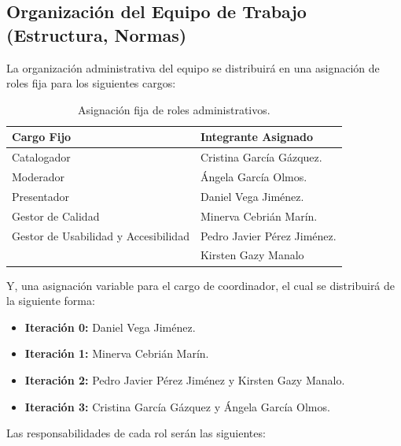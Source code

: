 \subsection{Organización del Equipo de Trabajo (Estructura, Normas)}

La organización administrativa del equipo se distribuirá en una asignación de roles fija para los siguientes cargos:

\begin{table}[htbp]
\centering
\small
{}
\begin{tabularx}{\textwidth}{l X}
\toprule
\rowcolor{verdeApagado}
\textbf{Cargo Fijo} & \textbf{Integrante Asignado} \\
\midrule
Catalogador & Cristina García Gázquez. \\
Moderador & Ángela García Olmos. \\
Presentador & Daniel Vega Jiménez. \\
Gestor de Calidad & Minerva Cebrián Marín. \\
Gestor de Usabilidad y Accesibilidad & Pedro Javier Pérez Jiménez. \\
 & Kirsten Gazy Manalo \\
\bottomrule
\end{tabularx}
\caption{Asignación fija de roles administrativos.}
\label{tab:roles_fijos}
\end{table}

Y, una asignación variable para el cargo de coordinador, el cual se distribuirá de la siguiente forma:
\begin{itemize}
    \item \textbf{Iteración 0:} Daniel Vega Jiménez.
    \item \textbf{Iteración 1:} Minerva Cebrián Marín.
    \item \textbf{Iteración 2:} Pedro Javier Pérez Jiménez y Kirsten Gazy Manalo.
    \item \textbf{Iteración 3:} Cristina García Gázquez y Ángela García Olmos.
\end{itemize}

Las responsabilidades de cada rol serán las siguientes:

